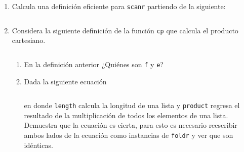 \documentclass[11pt,letterpaper]{article}
\newcommand{\code}[1]{\textcolor{WildStrawberry}{\texttt{#1}}}
\begin{document}
\begin{enumerate}
\begin{enumerate}[label=\alph*)]
\end{enumerate}

\item Calcula una definición eficiente para \code{scanr} partiendo de la siguiente:

\inputminted{haskell}{assets/3.hs}

\item Considera la siguiente definición de la función \code{cp} que calcula el producto cartesiano.

\inputminted{haskell}{assets/4-1.hs}

\begin{enumerate}[label=\alph*)]
    
    \item En la definición anterior ¿Quiénes son \code{f} y \code{e}?
    
    
    \item Dada la siguiente ecuación
    \inputminted{haskell}{assets/4-b.hs}

    en donde \code{length} calcula la longitud de una lista y \code{product} regresa el resultado de la
    multiplicación de todos los elementos de una lista. Demuestra que la ecuación es cierta, para esto
    es necesario reescribir ambos lados de la ecuación como instancias de \code{foldr} y ver que son idénticas.
\end{enumerate}


\end{enumerate}



\end{document}
